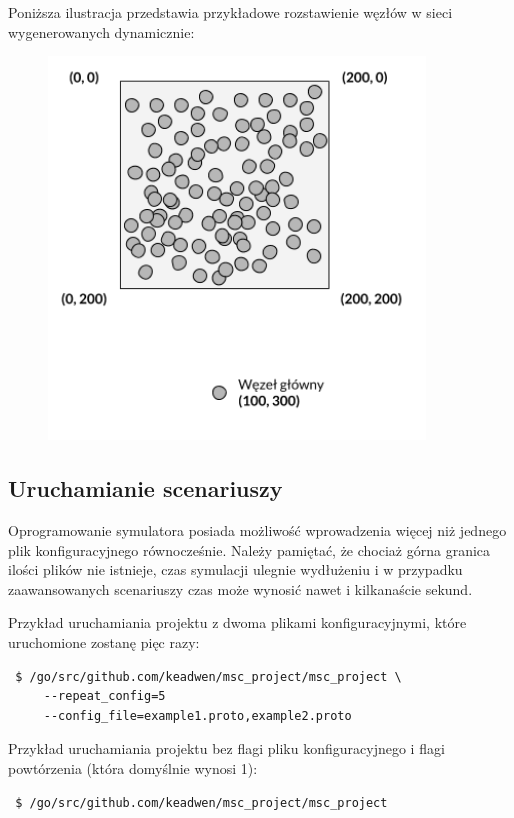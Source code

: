 \documentclass[a4paper,12pt,twoside,openany]{report}
\begin{document}
Poniższa ilustracja przedstawia przykładowe rozstawienie węzłów w sieci wygenerowanych dynamicznie:

\begin{figure}[H]
 \centering
 \includegraphics[width=10cm]{images/przykladowa_sieci_wygenerowana.png} 
\end{figure}

\subsection{Uruchamianie scenariuszy}

Oprogramowanie symulatora posiada możliwość wprowadzenia więcej niż jednego plik konfiguracyjnego równocześnie.
Należy pamiętać, że chociaż górna granica ilości plików nie istnieje, czas symulacji ulegnie wydłużeniu i w przypadku 
zaawansowanych scenariuszy czas może wynosić nawet i kilkanaście sekund.

Przykład uruchamiania projektu z dwoma plikami konfiguracyjnymi, które uruchomione zostanę pięc razy:

\begin{lstlisting}
 $ /go/src/github.com/keadwen/msc_project/msc_project \
     --repeat_config=5
     --config_file=example1.proto,example2.proto
\end{lstlisting}

Przykład uruchamiania projektu bez flagi pliku konfiguracyjnego i flagi powtórzenia (która domyślnie wynosi 1):

\begin{lstlisting}
 $ /go/src/github.com/keadwen/msc_project/msc_project
\end{lstlisting}
\end{document}
